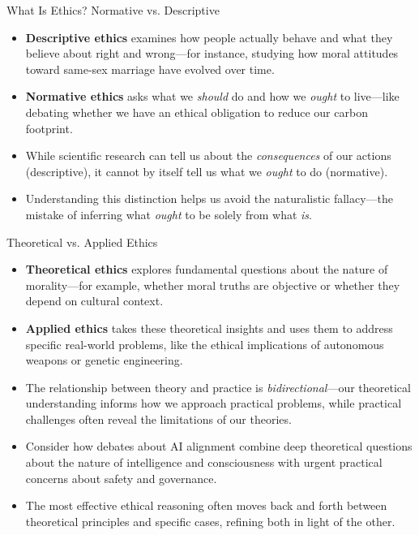 \documentclass[aspectratio=169]{beamer}
\begin{document}
\begin{frame}{What Is Ethics? Normative vs. Descriptive}
\begin{itemize}
\item \textbf{Descriptive ethics} examines how people actually behave and what they believe about right and wrong—for instance, studying how moral attitudes toward same-sex marriage have evolved over time.
\item \textbf{Normative ethics} asks what we \emph{should} do and how we \emph{ought} to live—like debating whether we have an ethical obligation to reduce our carbon footprint.
\item While scientific research can tell us about the \emph{consequences} of our actions (descriptive), it cannot by itself tell us what we \emph{ought} to do (normative).
\item Understanding this distinction helps us avoid the naturalistic fallacy—the mistake of inferring what \emph{ought} to be solely from what \emph{is}.
\end{itemize}
\end{frame}

\begin{frame}{Theoretical vs. Applied Ethics}
\begin{itemize}
\item \textbf{Theoretical ethics} explores fundamental questions about the nature of morality—for example, whether moral truths are objective or whether they depend on cultural context.
\item \textbf{Applied ethics} takes these theoretical insights and uses them to address specific real-world problems, like the ethical implications of autonomous weapons or genetic engineering.
\item The relationship between theory and practice is \emph{bidirectional}—our theoretical understanding informs how we approach practical problems, while practical challenges often reveal the limitations of our theories.
\item Consider how debates about AI alignment combine deep theoretical questions about the nature of intelligence and consciousness with urgent practical concerns about safety and governance.
\item The most effective ethical reasoning often moves back and forth between theoretical principles and specific cases, refining both in light of the other.
\end{itemize}
\end{frame}
\end{document}
